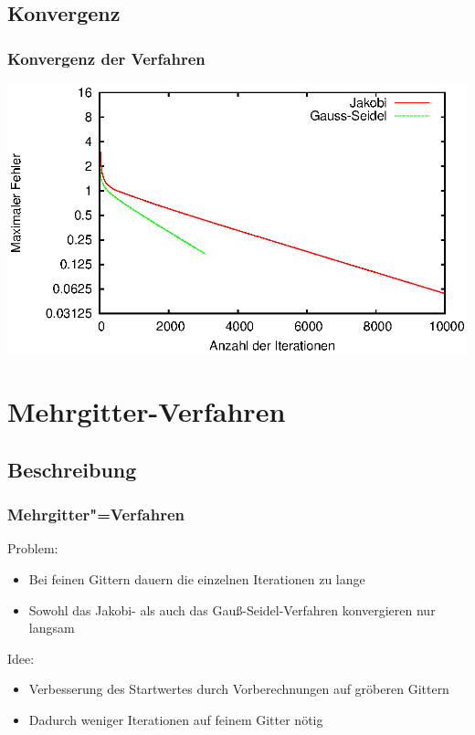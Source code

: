\documentclass{beamer}
\begin{document}
\subsection{Konvergenz}
\begin{frame}
    \frametitle{Konvergenz der Verfahren}
    \includegraphics[width=\textwidth]{plots/fehlerpres}
\end{frame}

\section{Mehrgitter-Verfahren}
\subsection{Beschreibung}
\begin{frame}
    \frametitle{Mehrgitter"=Verfahren}
    Problem:
    \begin{itemize}
        \item Bei feinen Gittern dauern die einzelnen Iterationen zu lange
        \item Sowohl das Jakobi- als auch das Gauß-Seidel-Verfahren konvergieren nur langsam
    \end{itemize}
    Idee:
    \begin{itemize}
        \item Verbesserung des Startwertes durch Vorberechnungen auf gröberen Gittern
        \item Dadurch weniger Iterationen auf feinem Gitter nötig
    \end{itemize}
\end{frame}
\end{document}
